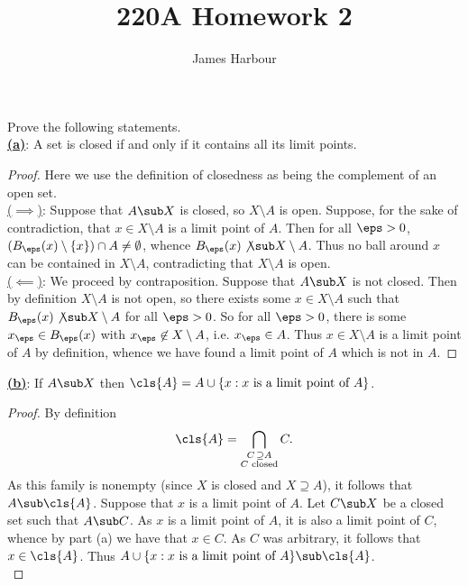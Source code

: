 \documentclass[12pt]{article}
\title{220A Homework 2}
\author{James Harbour}
\begin{document}
\maketitle



\begin{homeworkProblem}
  Prove the following statements.\ \\
  \underline{\textbf{(a)}}: A set is closed if and only if it contains all its limit points.

  \begin{proof}
    Here we use the definition of closedness as being the complement of an open set.\\

    \underline{($ \implies $)}: Suppose that $ A\sub X $ is closed, so $ X\setminus A $ is open. Suppose, for the sake of contradiction, that $ x\in X\setminus A $ is a limit point of $ A $. Then for all $ \eps>0 $, $ (B_{\eps}(x)\setminus\{x\})\cap A \neq \emptyset $, whence $ B_{\eps}(x)\not\sub X\setminus A $. Thus no ball around $ x $ can be contained in $ X\setminus A $, contradicting that $ X\setminus A $ is open.\\

    \underline{($ \impliedby $)}:  We proceed by contraposition. Suppose that $ A\sub X $ is not closed. Then by definition $ X\setminus A $ is not open, so there exists some $ x\in X\setminus A $ such that $ B_{\eps}(x)\not \sub X\setminus A $ for all $ \eps>0 $. So for all $ \eps>0 $, there is some $ x_{\eps}\in B_{\eps}(x) $ with $ x_{\eps}\not \in X\setminus A $, i.e. $ x_{\eps}\in A $. Thus $ x\in X\setminus A $ is a limit point of $ A $ by definition, whence we have found a limit point of $ A $ which is not in $ A $.
  \end{proof}

  \underline{\textbf{(b)}}: If $ A\sub X $ then $ \cls{A} = A\cup\{x:x\text{ is a limit point of }A\} $.

  \begin{proof}
    By definition
    \[
      \cls{A} = \bigcap_{\substack{C\,\supseteq A\\C\text{ closed}}}C.
    \]
    As this family is nonempty (since $ X $ is closed and $ X\supseteq A $), it follows that $ A\sub \cls{A} $. Suppose that $ x $ is a limit point of $ A $. Let $ C\sub X $ be a closed set such that $ A\sub C $. As $ x $ is a limit point of $ A $, it is also a limit point of $ C $, whence by part (a) we have that $ x\in C $. As $ C $ was arbitrary, it follows that $ x\in \cls{A} $. Thus $ A\cup \{x: x \text{ is a limit point of }A\}\sub \cls{A} $.\\


\end{proof}
\end{homeworkProblem}
\end{document}
